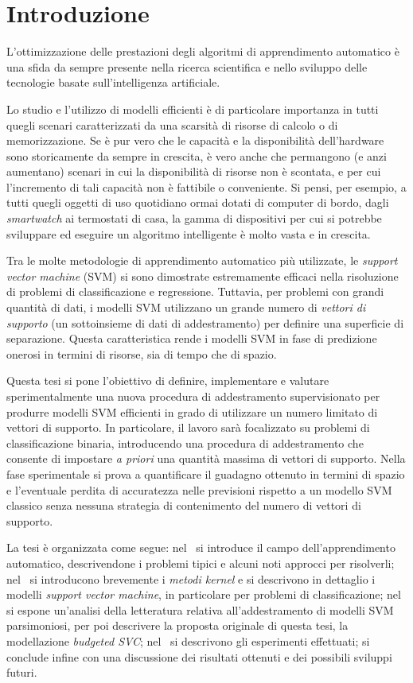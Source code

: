 \chapter{Introduzione}
\label{chap:introduzione}
L'ottimizzazione delle prestazioni degli algoritmi di apprendimento automatico è una sfida da sempre presente nella ricerca scientifica e nello sviluppo delle tecnologie basate sull'intelligenza artificiale.

Lo studio e l'utilizzo di modelli efficienti è di particolare importanza in tutti quegli scenari caratterizzati da una scarsità di risorse di calcolo o di memorizzazione.
Se è pur vero che le capacità e la disponibilità dell'hardware sono storicamente da sempre in crescita, è vero anche che permangono (e anzi aumentano) scenari in cui la disponibilità di risorse non è scontata, e per cui l'incremento di tali capacità non è fattibile o conveniente.
Si pensi, per esempio, a tutti quegli oggetti di uso quotidiano ormai dotati di computer di bordo, dagli \emph{smartwatch} ai termostati di casa, la gamma di dispositivi per cui si potrebbe sviluppare ed eseguire un algoritmo intelligente è molto vasta e in crescita.

Tra le molte metodologie di apprendimento automatico più utilizzate, le \emph{support vector machine} (SVM) si sono dimostrate estremamente efficaci nella risoluzione di problemi di classificazione e regressione. 
Tuttavia, per problemi con grandi quantità di dati, i modelli SVM utilizzano un grande numero di \emph{vettori di supporto} (un sottoinsieme di dati di addestramento) per definire una superficie di separazione. 
Questa caratteristica rende i modelli SVM in fase di predizione onerosi in termini di risorse, sia di tempo che di spazio.

Questa tesi si pone l'obiettivo di definire, implementare e valutare sperimentalmente una nuova procedura di addestramento supervisionato per produrre modelli SVM efficienti in grado di utilizzare un numero limitato di vettori di supporto.
In particolare, il lavoro sarà focalizzato su problemi di classificazione binaria, introducendo una procedura di addestramento che consente di impostare \emph{a priori} una quantità massima di vettori di supporto.
Nella fase sperimentale si prova a quantificare il guadagno ottenuto in termini di spazio e l'eventuale perdita di accuratezza nelle previsioni rispetto a un modello SVM classico senza nessuna strategia di contenimento del numero di vettori di supporto.

La tesi è organizzata come segue: nel~ si introduce il campo dell'apprendimento automatico, descrivendone i problemi tipici e alcuni noti approcci per risolverli; nel~ si introducono brevemente i \emph{metodi kernel} e si descrivono in dettaglio i modelli \emph{support vector machine}, in particolare per problemi di classificazione; nel~ si espone un'analisi della letteratura relativa all'addestramento di modelli SVM parsimoniosi, per poi descrivere la proposta originale di questa tesi, la modellazione \emph{budgeted SVC}; nel~ si descrivono gli esperimenti effettuati; si conclude infine con una discussione dei risultati ottenuti e dei possibili sviluppi futuri.